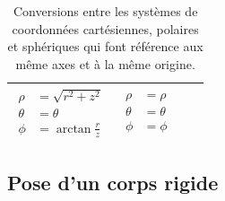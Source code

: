 \begin{table}[htbp]
\begin{tabular}{|p{3cm}|p{3cm}|p{3cm}|p{3cm}|}
{\begin{align*}
			\rho &= \sqrt{r^2+z^2} \\
			\theta &= \theta \\
			\phi &= \arctan \frac{r}{z}
			\end{align*}}
			& 
			\vbox{\begin{align*}
			\rho &= \rho \\
			\theta &= \theta \\
			\phi &= \phi
			\end{align*}}
			\\
		\hline
		\end{tabular}
	\caption{Conversions entre les systèmes de coordonnées cartésiennes, polaires et sphériques qui font référence aux même axes et à la même origine.}
	\label{tab:convcoord}
\end{table}

\subsection{Pose d'un corps rigide}
\label{sec:syscoordpose}

